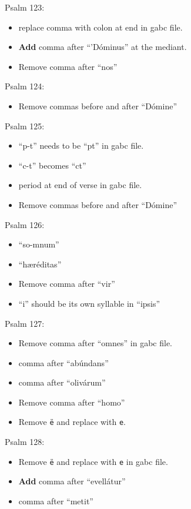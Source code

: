 \documentclass[11pt]{article}
\begin{document}
Psalm 123:
  \begin{itemize}
  \item
  replace comma with colon at end in gabc file.
  \item \textbf{Add} comma after ``'Dóminus'' at the mediant.
  \item  Remove comma after ``nos''
    \end{itemize}

Psalm 124:
  \begin{itemize}
  \item Remove commas before and after ``Dómine''
    \end{itemize}
      
               Psalm 125:
  \begin{itemize}
   \item
 ``p-t'' needs to be ``pt'' in gabc file.
     \item
    ``c-t'' becomes ``ct'' 
    \item
    period at end of
    verse in gabc file.
  \item Remove commas before and after ``Dómine''
    \end{itemize}
      
         Psalm 126:
  \begin{itemize}
  \item ``so-mnum''
  \item
  ``hæréditas''
  \item  Remove comma after ``vir''
    \item ``i'' should be its own syllable in ``ipsis''
  
    \end{itemize}
 
   Psalm 127:
  \begin{itemize}
  \item Remove comma after ``omnes'' in gabc file.
  \item
  comma after ``abúndans''
   \item
  comma after ``olivárum''
    \item Remove comma after ``homo''
 \item Remove \texttt{ë} and replace with \texttt{e}.
 
  \end{itemize}
  
  Psalm 128:
  \begin{itemize}
  \item Remove \texttt{ë} and replace with \texttt{e} in gabc file.
  \item \textbf{Add} comma after ``evellátur''
    \item
  comma after ``metit''
    \end{itemize}
 
\end{document}
